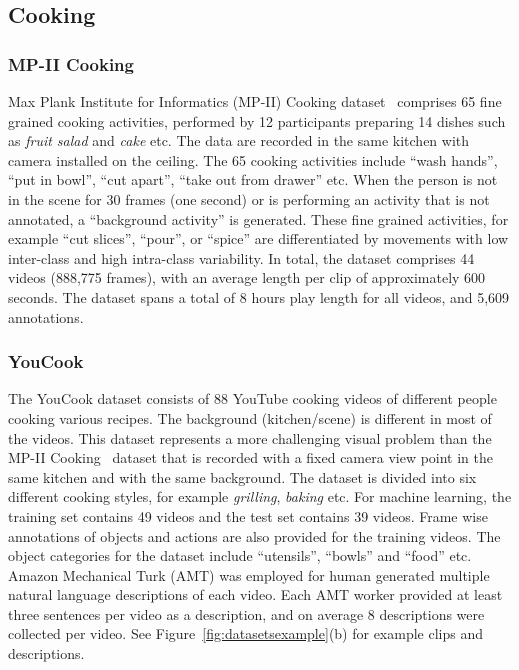 \documentclass[10pt,journal,compsoc]{IEEEtran}
\begin{document}
\subsection{Cooking} 
\subsubsection{MP-II Cooking} 
Max Plank Institute for Informatics (MP-II) Cooking dataset~\cite{rohrbach2012database} comprises 65 fine grained cooking activities, performed by 12 participants preparing 14 dishes such as \textit{fruit salad} and \textit{cake} etc. The data are recorded in the same kitchen with camera installed on the ceiling. The 65 cooking activities include ``wash hands'', ``put in bowl'', ``cut apart'', ``take out from drawer'' etc. When the person is not in the scene for 30 frames (one second) or is performing an activity that is not annotated, a ``background activity'' is generated. These fine grained activities, for example ``cut slices'', ``pour'', or ``spice'' are differentiated by movements with low inter-class and high intra-class variability. In total, the dataset comprises 44 videos (888,775 frames), with an average length per clip of approximately 600 seconds. The dataset spans a total of 8 hours play length for all videos, and 5,609 annotations.  

\subsubsection{YouCook}
The YouCook dataset \cite{das2013thousand} consists of 88 YouTube cooking videos of different people cooking various recipes. The background (kitchen/scene) is different in most of the videos. This dataset represents a more challenging visual problem than the MP-II Cooking~\cite{rohrbach2012database} dataset that is recorded with a fixed camera view point in the same kitchen and with the same background. The dataset is divided into six different cooking styles, for example \textit{grilling}, \textit{baking} etc. For machine learning, the training set contains 49 videos and the test set contains 39 videos. Frame wise annotations of objects and actions are also provided for the training videos. The object categories for the dataset include ``utensils'', ``bowls'' and ``food'' etc. Amazon Mechanical Turk (AMT) was employed for human generated multiple natural language descriptions of each video. Each AMT worker provided at least three sentences per video as a description, and on average 8 descriptions were collected per video. See Figure~\ref{fig:datasetsexample}(b) for example clips and descriptions.
\end{document}
